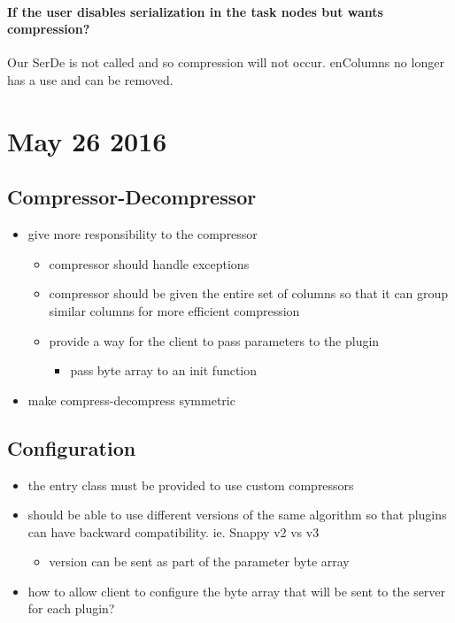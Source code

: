\documentclass[11pt,a4paper]{article}
\begin{document}
	\paragraph{If the user disables serialization in the task nodes but wants compression?}
	Our SerDe is not called and so compression will not occur. enColumns no longer has a use and can be removed.
	
\section*{May 26 2016}
	
	\subsection*{Compressor-Decompressor}
	\begin{itemize}
		\item give more responsibility to the compressor
		\begin{itemize}
			\item compressor should handle exceptions
			\item compressor should be given the entire set of columns so that it can group similar columns for more efficient compression
			\item provide a way for the client to pass parameters to the plugin
			\begin{itemize}
				\item pass byte array to an init function
			\end{itemize}
		\end{itemize}
		\item make compress-decompress symmetric
	\end{itemize}
	
	\subsection*{Configuration}
	
	\begin{itemize}
		\item the entry class must be provided to use custom compressors
		\item should be able to use different versions of the same algorithm so that plugins can have backward compatibility. ie. Snappy v2 vs v3
		\begin{itemize}
			\item version can be sent as part of the parameter byte array
		\end{itemize}
		\item how to allow client to configure the byte array that will be sent to the server for each plugin?
	\end{itemize}
	
\end{document}
